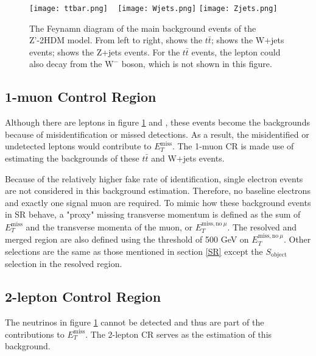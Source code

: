 \documentclass[class=NCU_thesis, crop=false]{standalone}
\begin{document}
		\begin{figure}[!hbt]
			\centering
			\subcaptionbox
			{\label{fig:subfig_ttbar}}
			{\texttt{[image: ttbar.png]}}
			~
			\subcaptionbox
			{\label{fig:subfig_Wjets}}
			{\texttt{[image: Wjets.png]}}
			\subcaptionbox
			{\label{fig:subfig_Zjets}}
			{\texttt{[image: Zjets.png]}}
			\caption{The Feynamn diagram of the main background events of the Z'-2HDM model. From left to right,  shows the $t\bar{t}$;  shows the W+jets events;  shows the Z+jets events. For the $t\bar{t}$ events, the lepton could also decay from the $\mathrm{W^-}$ boson, which is not shown in this figure.}
			\label{fig:background}
		\end{figure}

		\subsection{1-muon Control Region}
			Although there are leptons in figure \ref{fig:background}  and , these events become the backgrounds because of misidentification or missed detections. As a result, the misidentified or undetected leptons would contribute to $E_T^{\mathrm{miss}}$. The 1-muon CR is made use of estimating the backgrounds of these $t\bar{t}$ and W+jets events.
	
			Because of the relatively higher fake rate of identification, single electron events are not considered in this background estimation. Therefore, no baseline electrons and exactly one signal muon are required. To mimic how these background events in SR behave, a "proxy" missing transverse momentum is defined as the sum of $E_T^{\mathrm{miss}}$ and the transverse momenta of the muon, or $E_T^{\mathrm{miss, no}\ \mu}$. The resolved and merged region are also defined using the threshold of 500 GeV on $E_T^{\mathrm{miss, no }\ \mu}$. Other selections are the same as those mentioned in section \ref{SR} except the $S_{\mathrm{object}}$ selection in the resolved region.
	
		\subsection{2-lepton Control Region}\label{2LCR}
			The neutrinos in figure \ref{fig:background}  cannot be detected and thus are part of the contributions to $E_T^{\mathrm{miss}}$. The 2-lepton CR serves as the estimation of this background.
		
\end{document}
